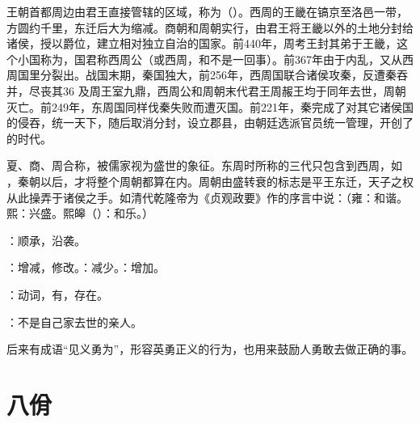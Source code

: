 {
王朝首都周边由君王直接管辖的区域，称为（）。西周的王畿在镐京至洛邑一带，方圆约千里，东迁后大为缩减。商朝和周朝实行，由君王将王畿以外的土地分封给诸侯，授以爵位，建立相对独立自治的国家。前440年，周考王封其弟于王畿，这个小国称为，国君称西周公（或西周，和不是一回事）。前367年由于内乱，又从西周国里分裂出。战国末期，秦国独大，前256年，西周国联合诸侯攻秦，反遭秦吞并，尽丧其36 及周王室九鼎，西周公和周朝末代君王周赧王均于同年去世，周朝灭亡。前249年，东周国同样伐秦失败而遭灭国。前221年，秦完成了对其它诸侯国的侵吞，统一天下，随后取消分封，设立郡县，由朝廷选派官员统一管理，开创了的时代。

夏、商、周合称，被儒家视为盛世的象征。东周时所称的三代只包含到西周，如 ，秦朝以后，才将整个周朝都算在内。周朝由盛转衰的标志是平王东迁，天子之权从此操弄于诸侯之手。如清代乾隆帝为《贞观政要》作的序言中说：（雍：和谐。熙：兴盛。熙皞（）：和乐。）

\item {}：顺承，沿袭。

\item {}：增减，修改。：减少。：增加。

\item {}：动词，有，存在。
}
{}  %


{
\item {}：不是自己家去世的亲人。
\item {}后来有成语“见义勇为”，形容英勇正义的行为，也用来鼓励人勇敢去做正确的事。
}
{}



\chapter{八佾}

